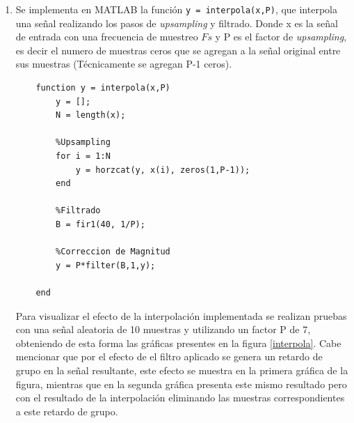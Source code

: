 \begin{enumerate}
    \item Se implementa en MATLAB la  función \texttt{y = interpola(x,P)}, que  interpola una señal realizando los pasos de \textit{upsampling} y filtrado. Donde x es la señal de entrada con una frecuencia de muestreo $Fs$ y P es el factor de \textit{upsampling}, es decir el numero de muestras ceros que se agregan a la señal original  entre sus  muestras (Técnicamente se agregan P-1 ceros).
    
    
    \begin{lstlisting}
    function y = interpola(x,P)
        y = [];
        N = length(x);
        
        %Upsampling
        for i = 1:N
            y = horzcat(y, x(i), zeros(1,P-1));
        end
        
        %Filtrado
        B = fir1(40, 1/P);
        
        %Correccion de Magnitud
        y = P*filter(B,1,y);
    
    end
    \end{lstlisting}
    
    Para visualizar el efecto de la interpolación implementada se realizan pruebas con una señal aleatoria de 10 muestras y utilizando un factor P de 7, obteniendo de esta forma las gráficas presentes en la figura \ref{interpola}. Cabe mencionar que por el efecto de el filtro aplicado se genera un retardo de grupo en la señal resultante, este efecto se muestra en la primera gráfica de la figura, mientras que en la segunda gráfica presenta este mismo resultado pero con el resultado de la interpolación eliminando las muestras correspondientes a este   retardo de grupo.
    
    
    

\end{enumerate}
